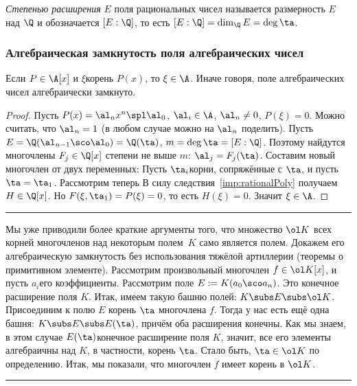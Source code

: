 \documentclass[a4paper]{article}
\newenvironment{petit}
{\par\smallskip\hrule\smallskip\footnotesize}{\par\smallskip\hrule\smallskip}
\begin{document}
\begin{df}
\emph{Степенью расширения} $E$ поля рациональных чисел называется размерность $E$ над $\Q$ и
обозначается $[E:\Q]$, то есть $[E:\Q]=\dim_{\Q}E=\deg\ta$.
\end{df}

\subsubsection{Алгебраическая замкнутость поля алгебраических чисел}

\begin{theorem}\label{thm:algClosureClosed}
Если $P\in\A[x]$ и $\xi$\т корень $P(x)$, то $\xi\in\A$. Иначе говоря, поле алгебраических чисел
алгебраически замкнуто.
\end{theorem}
\begin{proof}
Пусть $P(x)=\al_n x^n\spl \al_0$, $\al_i\in\A$, $\al_n\neq0$, $P(\xi)=0$. Можно считать,
что $\al_n=1$ (в любом случае можно на $\al_n$ поделить). Пусть
$E=\Q(\al_{n-1}\sco \al_0)=\Q(\ta)$, $m=\deg \ta=[E:\Q]$. Поэтому найдутся
многочлены $F_j\in\Q[x]$ степени не выше $m$: $\al_j=F_j(\ta)$. Составим новый многочлен от
двух переменных:
Пусть $\ta_i$\т корни, сопряжённые с $\ta$, и пусть $\ta = \ta_1$.
Рассмотрим теперь
В силу следствия~\ref{imp:rationalPoly} получаем $H\in\Q[x]$. Но $F(\xi,\ta_1)=P(\xi)=0$, то есть
$H(\xi)=0$. Значит $\xi\in\A$.
\end{proof}

\begin{petit}
Мы уже приводили более краткие аргументы того, что множество $\ol K$ всех корней многочленов над некоторым полем~$K$
само является полем. Докажем его алгебраическую замкнутость без использования тяжёлой артиллерии (теоремы о примитивном элементе).
Рассмотрим произвольный многочлен $f \in \ol K[x]$,
и пусть $a_i$\т его коэффициенты. Рассмотрим поле $E := K(a_0\sco a_n)$. Это конечное расширение поля $K$.
Итак, имеем такую башню полей: $K \subs E \subs \ol K$. Присоединим к полю $E$ корень $\ta$ многочлена $f$.
Тогда у нас есть ещё одна башня: $K \subs E \subs E(\ta)$, причём оба расширения конечны. Как мы знаем, в этом случае
$E(\ta)$\т конечное расширение поля $K$, значит, все его элементы алгебраичны над $K$, в частности, корень $\ta$.
Стало быть, $\ta \in \ol K$ по определению. Итак, мы показали, что многочлен $f$ имеет корень в $\ol K$.
\end{petit}
\end{document}
